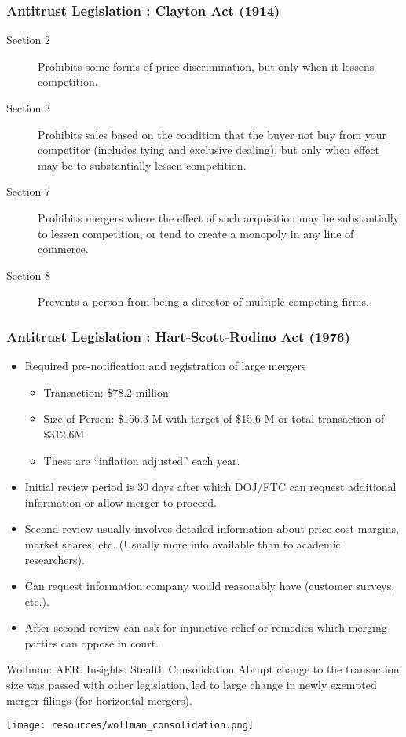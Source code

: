\documentclass[aspectratio=169,10pt]{beamer}
\begin{document}
\begin{frame}
\frametitle{Antitrust Legislation : Clayton Act (1914)}
 \begin{description}
\item [Section 2] Prohibits some forms of price discrimination, but only when it lessens competition.
\item [Section 3] Prohibits sales based on the condition that the buyer not buy from your competitor (includes tying and exclusive dealing), but only when effect may be to substantially lessen competition.
\item [Section 7] Prohibits mergers where the effect of such acquisition may be substantially to lessen competition, or tend to create a monopoly in any line of commerce.
\item [Section 8] Prevents a person from being a director of multiple competing firms.
 \end{description}
\end{frame}

\begin{frame}
\frametitle{Antitrust Legislation : Hart-Scott-Rodino Act (1976)}
 \begin{itemize}
\item Required pre-notification and registration of large mergers
\begin{itemize}
\item Transaction: \$78.2 million
\item Size of Person: \$156.3 M with target of \$15.6 M or total transaction of \$312.6M
\item These are ``inflation adjusted'' each year.
\end{itemize}
\item Initial review period is 30 days after which DOJ/FTC can request additional information or allow merger to proceed.
\item Second review usually involves detailed information about  price-cost margins, market shares, etc. (Usually more info available than to academic researchers).
\item Can request information company would reasonably have (customer surveys, etc.).
\item After second review can ask for \alert{injunctive relief} or \alert{remedies} which merging parties can oppose in court.
 \end{itemize}
\end{frame}

\begin{frame}{Wollman: AER: Insights: Stealth Consolidation}
Abrupt change to the transaction size was passed with other legislation, led to large change in newly exempted merger filings (for horizontal mergers).
\begin{center}
\texttt{[image: resources/wollman\_consolidation.png]}
\end{center}
\end{frame}
\end{document}
